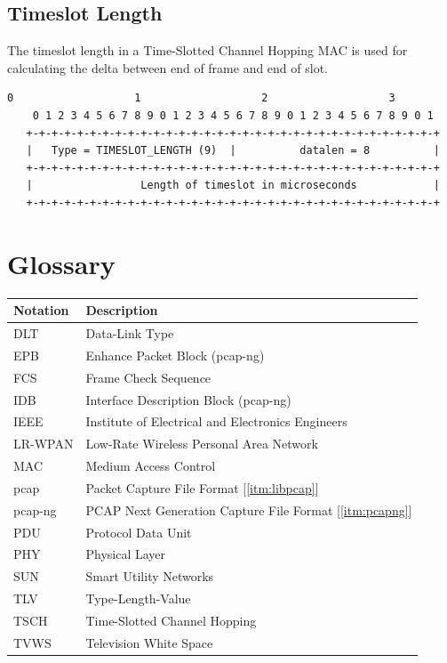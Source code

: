 \documentclass[12pt]{article}
\renewcommand\_{\textunderscore\allowbreak}
\begin{document}
\subsection{Timeslot Length}

The timeslot length in a Time-Slotted Channel Hopping MAC is used for
calculating the delta between end of frame and end of slot.

\begin{Verbatim}[samepage=true]
    0                   1                   2                   3
    0 1 2 3 4 5 6 7 8 9 0 1 2 3 4 5 6 7 8 9 0 1 2 3 4 5 6 7 8 9 0 1
   +-+-+-+-+-+-+-+-+-+-+-+-+-+-+-+-+-+-+-+-+-+-+-+-+-+-+-+-+-+-+-+-+
   |   Type = TIMESLOT_LENGTH (9)  |          datalen = 8          |
   +-+-+-+-+-+-+-+-+-+-+-+-+-+-+-+-+-+-+-+-+-+-+-+-+-+-+-+-+-+-+-+-+
   |                 Length of timeslot in microseconds            |
   +-+-+-+-+-+-+-+-+-+-+-+-+-+-+-+-+-+-+-+-+-+-+-+-+-+-+-+-+-+-+-+-+
\end{Verbatim}


\newpage
\section{Glossary}\label{sec:glos}
\begin{center}
\begin{tabular}{ |p{3cm}|p{10cm}| }
\hline
\textbf{Notation}   &  \textbf{Description}\\
\hline
DLT                 &  Data-Link Type\\
\hline
EPB                 &  Enhance Packet Block (pcap-ng)\\
\hline
FCS                 &  Frame Check Sequence\\
\hline
IDB                 &  Interface Description Block (pcap-ng)\\
\hline
IEEE                &  Institute of Electrical and Electronics Engineers\\
\hline
LR-WPAN             &  Low-Rate Wireless Personal Area Network\\
\hline
MAC                 &  Medium Access Control\\
\hline
pcap                &  Packet Capture File Format [\ref{itm:libpcap}]\\
\hline
pcap-ng             &  PCAP Next Generation Capture File Format [\ref{itm:pcapng}]\\
\hline
PDU                 &  Protocol Data Unit\\
\hline
PHY                 &  Physical Layer\\
\hline
SUN                 &  Smart Utility Networks\\
\hline
TLV                 &  Type-Length-Value\\
\hline
TSCH                &  Time-Slotted Channel Hopping\\
\hline
TVWS                &  Television White Space\\
\hline
\end{tabular}
\end{center}
\end{document}

